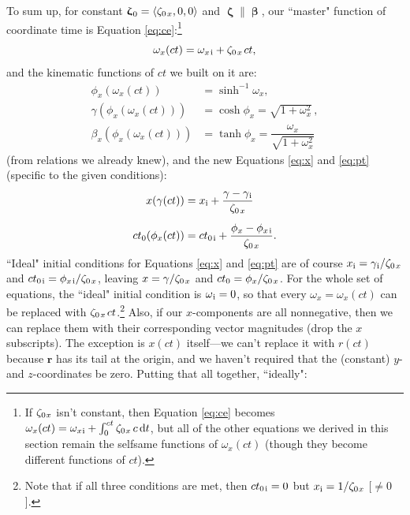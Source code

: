 \documentclass[12pt]{article}
\renewcommand{\vv}[1]{\mathbf{#1}}
\newcommand{\dd}[1]{\mathrm{d}#1}
\newcommand{\vvbeta}{\bm{\upbeta}}
\newcommand{\vvzeta}{\bm{\upzeta}}
\begin{document}
To sum up, for constant $\vvzeta_{\mkern1mu 0} = \langle \zeta_{0 \mkern2mu x} , 0, 0 \rangle$ and $\vvzeta \parallel \vvbeta$, our ``master" function of coordinate time is Equation \ref{eq:ce}:\footnote{If $\zeta_{0 \mkern1mu x}$ isn't constant, then Equation \ref{eq:ce} becomes $\omega_x (ct) = \omega_{x \mkern1mu \textrm{i} } + \int_0^{ct} \zeta_{0 \mkern1mu x} \, c \, \dd t$, but all of the other equations we derived in this section remain the selfsame functions of $\omega_x (ct)$ (though they become different functions of $ct$).}
\begin{equation*}
\omega_x (ct) = \omega_{x \mkern2mu \textrm{i} } + \zeta_{0 \mkern2mu x} \mkern2mu ct ,
\end{equation*}
and the kinematic functions of $ct$ we built on it are:
\begin{equation*}
\begin{aligned}
\phi_x (\omega_x(ct)) &= \sinh^{-1} \omega_x , \\[5pt]
\gamma (\phi_x(\omega_x(ct))) &= \cosh \phi_x = \sqrt{1 + \omega^2_x} \, , \\[3pt]
\beta_x (\phi_x(\omega_x(ct))) &= \tanh \phi_x = \dfrac{\omega_x}{\sqrt{1 + \omega^2_x }}
\end{aligned}
\end{equation*}
(from relations we already knew), and the new Equations \ref{eq:x} and \ref{eq:pt} (specific to the given conditions):
\begin{equation*}
\begin{aligned}
x (\gamma(ct)) &= x_{\mathrm{i}} + \dfrac{ \gamma - \gamma_{\mkern1mu \mathrm{i}} }{ \zeta_{0 \mkern2mu x}} \\[5pt]
ct_0 (\phi_x(ct)) &= ct_{0 \mkern2mu \mathrm{i}} + \dfrac{ \phi_x - \phi_{x \mkern2mu \mathrm{i} }}{ \zeta_{0 \mkern2mu x}} .
\end{aligned}
\end{equation*}
``Ideal" initial conditions for Equations \ref{eq:x} and \ref{eq:pt} are of course $x_{\mathrm{i}} = \gamma_{\mkern1mu \mathrm{i}} / \zeta_{0 \mkern2mu x}$ and $ct_{0 \mkern2mu \mathrm{i}} = \phi_{x \mkern2mu \mathrm{i} } / \zeta_{0 \mkern2mu x}$, leaving $x = \gamma / \zeta_{0 \mkern2mu x}$ and $ct_0 = \phi_x / \zeta_{0 \mkern2mu x}$. For the whole set of equations, the ``ideal" initial condition is $\omega_{\mkern1mu \textrm{i}} = 0$, so that every $\omega_x = \omega_x (ct)$ can be replaced with $\zeta_{0 \mkern2mu x} \mkern2mu ct$.\footnote{Note that if all three conditions are met, then $ct_{0 \mkern2mu \mathrm{i}} = 0$ but $x_{\mathrm{i}} = 1 / \zeta_{0 \mkern1mu x}$ [$\neq 0$].} Also, if our $x$-components are all nonnegative, then we can replace them with their corresponding vector magnitudes (drop the $x$ subscripts). The exception is $x(ct)$ itself---we can't replace it with $r(ct)$ because $\vv r$ has its tail at the origin, and we haven't required that the (constant) $y$- and $z$-coordinates be zero. Putting that all together, ``ideally":
\end{document}
